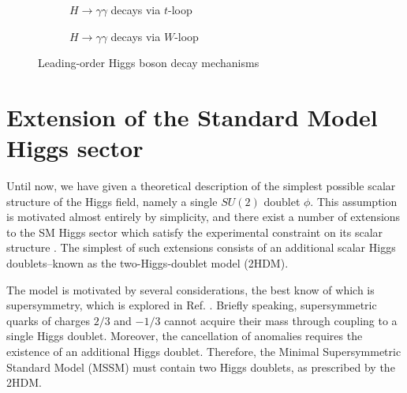 \begin{figure}[h!]
\begin{subfigure}[b]{0.48\textwidth}
        \caption{$H\rightarrow \gamma\gamma$ decays via $t$-loop}
        \label{subfig:H-yy-t}
    \end{subfigure}
    \begin{subfigure}[b]{0.48\textwidth}
        \centering
        \caption{$H\rightarrow \gamma\gamma$ decays via $W$-loop}
        \label{subfig:hyy-W}
    \end{subfigure}
    \caption{Leading-order Higgs boson decay mechanisms}
    \label{fig:higgs-decays}
\end{figure} 

\section{Extension of the Standard Model Higgs sector}
\label{sect:introduce-2HDM}

Until now, we have given a theoretical description of the simplest possible scalar structure of the Higgs field, namely a single $SU(2)$ doublet $\phi$. 
This assumption is motivated almost entirely by simplicity, and there exist a number of extensions to the SM Higgs sector which satisfy the experimental constraint on its scalar structure \cite{Zyla:2020zbs}. 
The simplest of such extensions consists of an additional scalar Higgs doublets--known as the two-Higgs-doublet model (2HDM). 

The model is motivated by several considerations, the best know of which is supersymmetry, which is explored in Ref. \cite{HABER198575}. Briefly speaking, supersymmetric quarks of charges $2/3$ and $-1/3$ cannot acquire their mass through coupling to a single Higgs doublet. Moreover, the cancellation of anomalies requires the existence of an additional Higgs doublet. Therefore, the Minimal Supersymmetric Standard Model (MSSM) must contain two Higgs doublets, as prescribed by the 2HDM.

